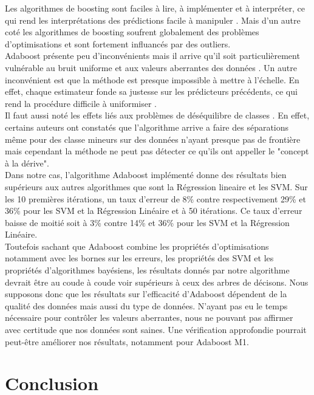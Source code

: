 \documentclass{article}
\begin{document}
Les algorithmes de boosting sont faciles à lire, à implémenter et à interpréter, ce qui rend les interprétations des prédictions facile à manipuler \cite{FreundSchapire1996}. Mais d'un autre coté les algorithmes de boosting soufrent globalement des problèmes d'optimisations et sont fortement influancés par des outliers.\\

Adaboost présente peu d'inconvénients mais il arrive qu'il soit particulièrement vulnérable au bruit uniforme et aux valeurs aberrantes des données \cite{educba}. 
Un autre inconvénient est que la méthode est presque impossible à mettre à l'échelle. En effet, chaque estimateur fonde sa justesse sur les prédicteurs précédents, ce qui rend la procédure difficile à uniformiser \cite{corporatefinanceinstitute}.\\

Il faut aussi noté les effets liés aux problèmes de déséquilibre de classes \cite{Longadage-2013}. En effet, certains auteurs ont constatés que l'algorithme arrive a faire des séparations même pour des classe mineurs sur des données n'ayant presque pas de frontière mais cependant la méthode ne peut pas détecter ce qu'ils ont appeller le "concept à la dérive".\\

Dans notre cas, l'algorithme Adaboost implémenté donne des résultats bien supérieurs aux autres algorithmes que sont la Régression lineaire et les SVM. Sur les 10 premières itérations, un taux d'erreur de 8\% contre respectivement 29\% et 36\% pour les SVM et la Régression Linéaire et à 50 itérations. Ce taux d'erreur baisse de moitié soit à 3\% contre 14\% et 36\% pour les SVM et la Régression Linéaire.\\
Toutefois sachant que Adaboost combine les propriétés d'optimisations notamment avec les bornes sur les erreurs, les propriétés des SVM et les propriétés d'algorithmes bayésiens, les résultats donnés par notre algorithme devrait être au coude à coude voir supérieurs à ceux des arbres de décisons. Nous supposons donc que les résultats sur l'efficacité d'Adaboost dépendent de la qualité des données mais aussi du type de données. N'ayant pas eu le temps nécessaire pour contrôler les valeurs aberrantes, nous ne pouvant pas affirmer avec certitude que nos données sont saines. Une vérification approfondie pourrait peut-être améliorer nos résultats, notamment pour Adaboost M1.

\section{Conclusion}
\end{document}
